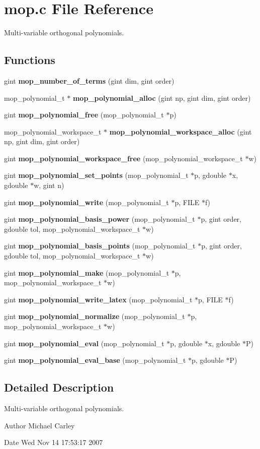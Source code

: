 \section{mop.\+c File Reference}
\label{mop_8c}


Multi-\/variable orthogonal polynomials.  


\subsection*{Functions}
\begin{DoxyCompactItemize}
\item 
gint {\bf mop\+\_\+number\+\_\+of\+\_\+terms} (gint dim, gint order)
\item 
mop\+\_\+polynomial\+\_\+t $\ast$ {\bf mop\+\_\+polynomial\+\_\+alloc} (gint np, gint dim, gint order)
\item 
gint {\bf mop\+\_\+polynomial\+\_\+free} (mop\+\_\+polynomial\+\_\+t $\ast$p)
\item 
mop\+\_\+polynomial\+\_\+workspace\+\_\+t $\ast$ {\bf mop\+\_\+polynomial\+\_\+workspace\+\_\+alloc} (gint np, gint dim, gint order)
\item 
gint {\bf mop\+\_\+polynomial\+\_\+workspace\+\_\+free} (mop\+\_\+polynomial\+\_\+workspace\+\_\+t $\ast$w)
\item 
gint {\bf mop\+\_\+polynomial\+\_\+set\+\_\+points} (mop\+\_\+polynomial\+\_\+t $\ast$p, gdouble $\ast$x, gdouble $\ast$w, gint n)
\item 
gint {\bf mop\+\_\+polynomial\+\_\+write} (mop\+\_\+polynomial\+\_\+t $\ast$p, F\+I\+L\+E $\ast$f)
\item 
gint {\bf mop\+\_\+polynomial\+\_\+basis\+\_\+power} (mop\+\_\+polynomial\+\_\+t $\ast$p, gint order, gdouble tol, mop\+\_\+polynomial\+\_\+workspace\+\_\+t $\ast$w)
\item 
gint {\bf mop\+\_\+polynomial\+\_\+basis\+\_\+points} (mop\+\_\+polynomial\+\_\+t $\ast$p, gint order, gdouble tol, mop\+\_\+polynomial\+\_\+workspace\+\_\+t $\ast$w)
\item 
gint {\bf mop\+\_\+polynomial\+\_\+make} (mop\+\_\+polynomial\+\_\+t $\ast$p, mop\+\_\+polynomial\+\_\+workspace\+\_\+t $\ast$w)
\item 
gint {\bf mop\+\_\+polynomial\+\_\+write\+\_\+latex} (mop\+\_\+polynomial\+\_\+t $\ast$p, F\+I\+L\+E $\ast$f)
\item 
gint {\bf mop\+\_\+polynomial\+\_\+normalize} (mop\+\_\+polynomial\+\_\+t $\ast$p, mop\+\_\+polynomial\+\_\+workspace\+\_\+t $\ast$w)
\item 
gint {\bf mop\+\_\+polynomial\+\_\+eval} (mop\+\_\+polynomial\+\_\+t $\ast$p, gdouble $\ast$x, gdouble $\ast$P)
\item 
gint {\bf mop\+\_\+polynomial\+\_\+eval\+\_\+base} (mop\+\_\+polynomial\+\_\+t $\ast$p, gdouble $\ast$P)
\end{DoxyCompactItemize}


\subsection{Detailed Description}
Multi-\/variable orthogonal polynomials. 

\begin{DoxyAuthor}{Author}
Michael Carley 
\end{DoxyAuthor}
\begin{DoxyDate}{Date}
Wed Nov 14 17\+:53\+:17 2007 
\end{DoxyDate}
